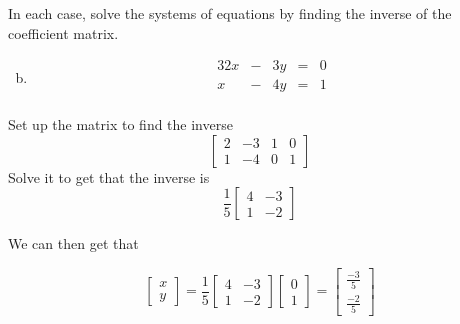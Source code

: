 \documentclass[../main.tex]{subfiles}
\begin{document}
In each case, solve the systems of equations by finding the inverse of the coefficient matrix.
\begin{enumerate}[a)]
	\setcounter{enumi}{1}
	\item 
		\begin{alignat*}{3}
			2x & {}-{} & 3y & {}={} & 0 \\
			 x & {}-{} & 4y & {}={} & 1 \\
		\end{alignat*}
\end{enumerate}

\solution
Set up the matrix to find the inverse
\[\left[\begin{array}{rr|rr}
        2 & -3 & 1 & 0\\
        1 & -4 & 0 & 1
        \end{array}\right]\]
Solve it to get that the inverse is
\[\frac{1}{5}\left[\begin{array}{rr}
        4 & -3\\
        1 & -2
        \end{array}\right]\]

We can then get that

\[\left[\begin{array}{r}
        x \\
        y
    \end{array}\right]
    =
    \frac{1}{5}\left[\begin{array}{rr}
        4 & -3\\
        1 & -2
        \end{array}\right]
    \left[\begin{array}{r}
        0\\
        1
    \end{array}\right]
    =
    \left[\begin{array}{r}
        \frac{-3}{5}\\
        \frac{-2}{5}
    \end{array}\right]
\]
\end{document}
